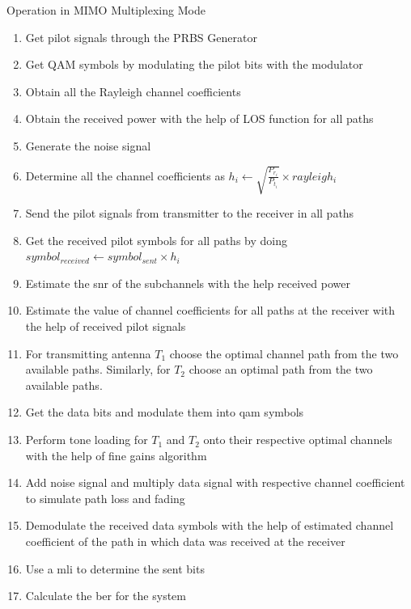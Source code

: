 \begin{algorithm}[!htbp]
\caption{Operation in MIMO Multiplexing Mode}
\label{alg:Operation in MIMO Multiplexing Mode}
\begin{enumerate}
\item Get pilot signals through the PRBS Generator
\item Get QAM symbols by modulating the pilot bits with the modulator
\item Obtain all the Rayleigh channel coefficients
\item Obtain the received power with the help of LOS function for all  paths
\item Generate the noise signal
\item Determine all the channel coefficients as $h_i \gets \sqrt{\frac{P_{r_i}}{P_{t_i}}} \times rayleigh_i$
\item Send the pilot signals from transmitter to the receiver in all paths
\item Get the received pilot symbols for all paths by doing $symbol_{received} \gets symbol_{sent} \times h_i$
\item Estimate the \acrshort{snr} of the subchannels with the help received power
\item Estimate the value of channel coefficients for all paths at the receiver with the help of received pilot signals
\item For transmitting antenna $T_1$ choose the optimal channel path from the two available paths. Similarly, for $T_2$ choose an optimal path from the two available paths.
\item Get the data bits and modulate them into \acrshort{qam} symbols
\item Perform tone loading for $T_1$ and $T_2$ onto their respective optimal channels with the help of fine gains algorithm
\item Add noise signal and multiply data signal with respective channel coefficient to simulate path loss and fading
\item Demodulate the received data symbols with the help of estimated channel coefficient of the path in which data was received at the receiver
\item Use a \acrlong{mli} to determine the sent bits
\item Calculate the \acrshort{ber} for the system
\end{enumerate}
\end{algorithm}

